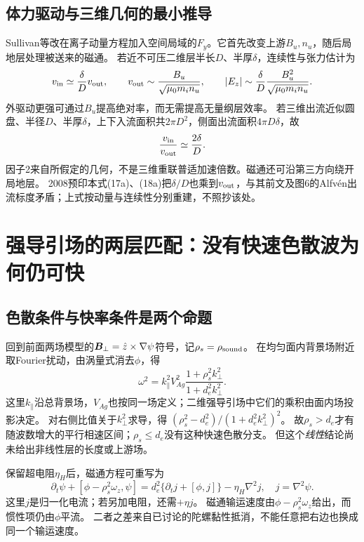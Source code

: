 \documentclass[UTF8,a4paper,11pt,openany,fontset=fandol]{ctexbook}
\begin{document}
\subsection{体力驱动与三维几何的最小推导}
Sullivan等改在离子动量方程加入空间局域的$F_y$。它首先改变上游$B_u,n_u$，随后局地层处理被送来的磁通。
若近不可压二维层半长$D$、半厚$\delta$，连续性与张力估计为
\begin{equation}
 v_{\rm in}\simeq\frac\delta D v_{\rm out},\qquad
 v_{\rm out}\sim\frac{B_u}{\sqrt{\mu_0m_in_u}},\qquad
 |E_z|\sim\frac\delta D\frac{B_u^2}{\sqrt{\mu_0m_in_u}}.
\end{equation}
外驱动更强可通过$B_u$提高绝对率，而无需提高无量纲层效率。
若三维出流近似圆盘、半径$D$、半厚$\delta$，上下入流面积共$2\pi D^2$，侧面出流面积$4\pi D\delta$，故
\begin{equation}
 \frac{v_{\rm in}}{v_{\rm out}}\simeq\frac{2\delta}{D}.
\end{equation}
因子2来自所假定的几何，不是三维重联普适加速倍数。磁通还可沿第三方向绕开局地层。
2008预印本式(17a)、(18a)把$\delta/D$也乘到$v_{\rm out}$，与其前文及图6的Alfvén出流标度矛盾；上式按动量与连续性分别重建，不照抄该处。\citep{L076,F717}

\section{强导引场的两层匹配：没有快速色散波为何仍可快}
\subsection{色散条件与快率条件是两个命题}
回到前面两场模型的$\bm{B}_\perp=\hat z\times\nabla\psi$符号，记$\rho_s=\rho_{\rm sound}$。
在均匀面内背景场附近取Fourier扰动，由涡量式消去$\phi$，得
\begin{equation}
 \omega^2=k_\parallel^2 V_{Ag}^2
 \frac{1+\rho_s^2k_\perp^2}{1+d_e^2k_\perp^2}.
 \label{eq:guide_dispersion}
\end{equation}
这里$k_\parallel$沿总背景场，$V_{Ag}$也按同一场定义；二维强导引场中它们的乘积由面内场投影决定。
对右侧比值关于$k_\perp^2$求导，得
$(\rho_s^2-d_e^2)/(1+d_e^2k_\perp^2)^2$。
故$\rho_s>d_e$才有随波数增大的平行相速区间；$\rho_s\le d_e$没有这种快速色散分支。
但这个\emph{线性}结论尚未给出非线性层的长度或上游场。\citep{L216,L217}

保留超电阻$\eta_H$后，磁通方程可重写为
\begin{equation}
 \partial_t\psi+[\phi-\rho_s^2\omega_z,\psi]
 =d_e^2\{\partial_tj+[\phi,j]\}-\eta_H\nabla^2j,
 \quad j=\nabla^2\psi.
\end{equation}
这里$j$是归一化电流；若另加电阻，还需$+\eta j$。
磁通输运速度由$\phi-\rho_s^2\omega_z$给出，而惯性项仍由$\phi$平流。
二者之差来自已讨论的陀螺黏性抵消，不能任意把右边也换成同一个输运速度。
\end{document}
